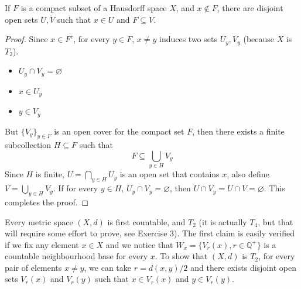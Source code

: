 \documentclass[../../main.tex]{subfiles}
\begin{document}
\begin{wts}
If $F$ is a compact subset of a Hausdorff space $X$, and $x\notin F$, there are disjoint open sets $U, V$ such that $x\in U$ and $F\subseteq V$.
\end{wts}
\begin{proof}
Since $x\in F^c$, for every $y\in F$, $x\neq y$ induces two sets $U_y, V_y$ (because $X$ is $T_2$).
\begin{itemize}
    \item $U_y\cap V_y=\varnothing$
    \item $x\in U_y$
    \item $y\in V_y$
\end{itemize}
But $\{V_y\}_{y\in F}$ is an open cover for the compact set $F$, then there exists a finite subcollection $H\subseteq F$ such that 
\[
F\subseteq \bigcup_{y\in H}V_y
\]
Since $H$ is finite, $U=\bigcap_{y\in H}U_y$ is an open set that contains $x$, also define $V = \bigcup_{y\in H}V_y$. If for every $y\in H$, $U_y\cap V_y=\varnothing$, then $U\cap V_y=U\cap V=\varnothing$. This completes the proof.
\end{proof}
\begin{remark}
    Every metric space $(X,d)$ is first countable, and $T_2$ (it is actually $T_4$, but that will require some effort to prove, see Exercise 3). The first claim is easily verified if we fix any element $x\in X$ and we notice that $W_x=\{V_{r}(x), r\in \mathbb{Q}^+\}$ is a countable neighbourhood base for every $x$. To show that $(X,d)$ is $T_2$, for every pair of elements $x\neq y$, we can take $r=d(x,y)/2$ and there exists disjoint open sets $V_r(x)$ and $V_r(y)$ such that $x\in V_r(x)$ and $y\in V_r(y)$.
\end{remark} 
\end{document}

